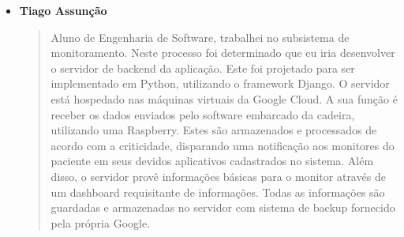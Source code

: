 \begin{itemize}
    \item \textbf{Tiago Assunção}
    \begin{quote}
      Aluno de Engenharia de Software, trabalhei no subsistema de 
      monitoramento. Neste processo foi determinado que eu iria desenvolver
        o servidor de backend da aplicação. Este foi projetado para ser implementado
        em Python, utilizando o framework Django. O servidor está hospedado nas máquinas virtuais
        da Google Cloud. A sua função é receber os dados enviados pelo software embarcado
        da cadeira, utilizando uma Raspberry. Estes são armazenados e processados de
        acordo com a criticidade, disparando uma notificação aos monitores do paciente
        em seus devidos aplicativos cadastrados no sistema. Além disso, o servidor provê
        informações básicas para o monitor através de um dashboard requisitante de informações.
        Todas as informações são guardadas e armazenadas no servidor com sistema de backup
        fornecido pela própria Google.
    \end{quote}
\end{itemize}
